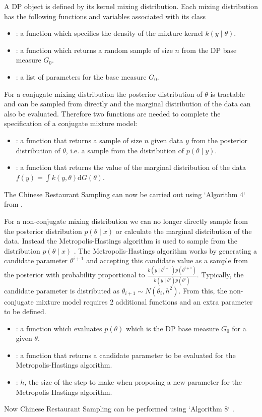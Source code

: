 \documentclass[nojss]{jss}
\begin{document}
A DP object is defined by its kernel mixing distribution. Each mixing distribution has the following functions and variables associated with its class
\begin{itemize}
\item {}: a function which specifies the density of the mixture kernel $k(y \mid \theta)$.
\item {}: a function which returns a random sample of size $n$ from the DP base measure $G_0$.
\item {}: a list of parameters for the base measure $G_0$.
\end{itemize}

For a conjugate mixing distribution the posterior distribution of $\theta$ is tractable and can be sampled from directly and the marginal distribution of the data can also be evaluated. Therefore two functions are needed to complete the specification of a conjugate mixture model:
\begin{itemize}
\item {}: a function that returns a sample of size $n$ given data $y$ from the posterior distribution of $\theta$, i.e. a sample from the distribution of $p(\theta \mid y)$.
\item {}: a function that returns the value of the marginal distribution of the data $f(y) = \int k(y , \theta) \mathrm{d} G(\theta)$.
\end{itemize}
The Chinese Restaurant Sampling can now be carried out using `Algorithm 4` from \cite{neal_markov_2000}.

For a non-conjugate mixing distribution we can no longer directly sample from the posterior distribution $p(\theta \mid x)$ or calculate the marginal distribution of the data. Instead the Metropolis-Hastings algorithm is used to sample from the distribution $p(\theta \mid x)$ \cite{hastings_monte_1970}. The Metropolis-Hastings algorithm works by generating a candidate parameter $\theta ^{i+1}$ and accepting this candidate value as a sample from the posterior with probability proportional to $\frac{k(y \mid \theta ^{i+1}) p(\theta ^{i+1})}{k(y \mid \theta^i) p(\theta^i)}$. Typically, the candidate parameter is distributed as $\theta _{i+1} \sim N(\theta _i, h^2)$. From this, the non-conjugate mixture model requires 2 additional functions and an extra parameter to be defined.
\begin{itemize}
\item {}: a function which evaluates $p(\theta)$ which is the DP base measure $G_0$ for a given $\theta$.
\item {}: a function that returns a candidate parameter to be evaluated for the Metropolis-Hastings algorithm.
\item {}: $h$, the size of the step to make when proposing a new parameter for the Metropolis Hastings algorithm.
\end{itemize}
Now Chinese Restaurant Sampling can be performed using `Algorithm 8` \citep{neal_markov_2000}.
\end{document}
